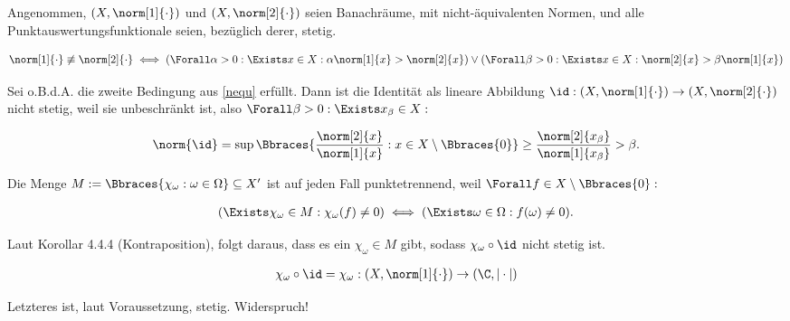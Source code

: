 \begin{solution}

Angenommen, $(X, \norm[1]{\cdot})$ und $(X, \norm[2]{\cdot})$ seien Banachräume, mit nicht-äquivalenten Normen, und alle Punktauswertungsfunktionale seien, bezüglich derer, stetig.

\begin{align}
\label{nequ}
  \norm[1]{\cdot} \not \equiv \norm[2]{\cdot}
  \iff
  (
    \Forall \alpha > 0:
    \Exists x \in X:
    \alpha \norm[1]{x} > \norm[2]{x}
  )
  \lor
  (
    \Forall \beta > 0:
    \Exists x \in X:
    \norm[2]{x} > \beta \norm[1]{x}
  )
\end{align}

Sei o.B.d.A. die zweite Bedingung aus \eqref{nequ} erfüllt.
Dann ist die Identität als lineare Abbildung $\id: (X, \norm[1]{\cdot}) \to (X, \norm[2]{\cdot})$ nicht stetig, weil sie unbeschränkt ist, also $\Forall \beta > 0: \Exists x_\beta \in X:$

\begin{align*}
  \norm{\id}
  =
  \sup \Bbraces
  {
    \frac{\norm[2]{x}}{\norm[1]{x}}:
    x \in X \setminus \Bbraces{0}
  }
  \geq
  \frac{\norm[2]{x_\beta}}{\norm[1]{x_\beta}}
  >
  \beta.
\end{align*}

Die Menge $M := \Bbraces{\chi_\omega: \omega \in \Omega} \subseteq X^\prime$ ist auf jeden Fall punktetrennend, weil $\Forall f \in X \setminus \Bbraces{0}:$

\begin{align*}
  (
    \Exists \chi_\omega \in M:
    \chi_\omega(f) \neq 0
  )
  \iff
  (
    \Exists \omega \in \Omega:
    f(\omega) \neq 0
  ).
\end{align*}

Laut Korollar 4.4.4 (Kontraposition), folgt daraus, dass es ein $\chi_\omega \in M$ gibt, sodass $\chi_\omega \circ \id$ nicht stetig ist.

\begin{align*}
  \chi_\omega \circ \id
  =
  \chi_\omega:
  (X, \norm[1]{\cdot}) \to (\C, |\cdot|)
\end{align*}

Letzteres ist, laut Voraussetzung, stetig. Widerspruch!

\end{solution}
